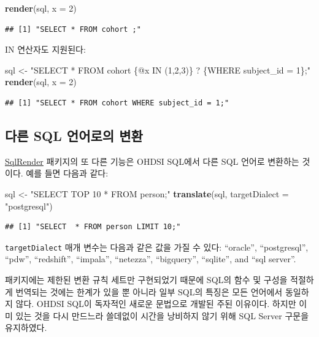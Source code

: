 \documentclass[10.5pt]{book}
\newenvironment{Shaded}{\begin{snugshade}}{\end{snugshade}}
\newcommand{\KeywordTok}[1]{\textcolor[rgb]{0.13,0.29,0.53}{\textbf{#1}}}
\newcommand{\DataTypeTok}[1]{\textcolor[rgb]{0.13,0.29,0.53}{#1}}
\newcommand{\DecValTok}[1]{\textcolor[rgb]{0.00,0.00,0.81}{#1}}
\newcommand{\StringTok}[1]{\textcolor[rgb]{0.31,0.60,0.02}{#1}}
\newcommand{\NormalTok}[1]{#1}
\theoremstyle{definition}
\theoremstyle{definition}
\theoremstyle{definition}
\theoremstyle{remark}
\let\BeginKnitrBlock\begin \let\EndKnitrBlock\end
\begin{document}
\begin{Shaded}
\begin{Highlighting}[]
\KeywordTok{render}\NormalTok{(sql, }\DataTypeTok{x =} \DecValTok{2}\NormalTok{)}
\end{Highlighting}
\end{Shaded}

\begin{verbatim}
## [1] "SELECT * FROM cohort ;"
\end{verbatim}

IN 연산자도 지원된다:

\begin{Shaded}
\begin{Highlighting}[]
\NormalTok{sql <-}\StringTok{ "SELECT * FROM cohort \{@x IN (1,2,3)\} ? \{WHERE subject_id = 1\};"}
\KeywordTok{render}\NormalTok{(sql, }\DataTypeTok{x =} \DecValTok{2}\NormalTok{)}
\end{Highlighting}
\end{Shaded}

\begin{verbatim}
## [1] "SELECT * FROM cohort WHERE subject_id = 1;"
\end{verbatim}

\subsection{다른 SQL 언어로의 변환}\label{-sql--}

\href{https://ohdsi.github.io/SqlRender/}{SqlRender} 패키지의 또 다른
기능은 OHDSI SQL에서 다른 SQL 언어로 변환하는 것이다. 예를 들면 다음과
같다:

\begin{Shaded}
\begin{Highlighting}[]
\NormalTok{sql <-}\StringTok{ "SELECT TOP 10 * FROM person;"}
\KeywordTok{translate}\NormalTok{(sql, }\DataTypeTok{targetDialect =} \StringTok{"postgresql"}\NormalTok{)}
\end{Highlighting}
\end{Shaded}

\begin{verbatim}
## [1] "SELECT  * FROM person LIMIT 10;"
\end{verbatim}

\texttt{targetDialect} 매개 변수는 다음과 같은 값을 가질 수 있다:
``oracle'', ``postgresql'', ``pdw'', ``redshift'', ``impala'',
``netezza'', ``bigquery'', ``sqlite'', and ``sql server''.

\BeginKnitrBlock{rmdimportant}
패키지에는 제한된 변환 규칙 세트만 구현되었기 때문에 SQL의 함수 및
구성을 적절하게 번역되는 것에는 한계가 있을 뿐 아니라 일부 SQL의 특징은
모든 언어에서 동일하지 않다. OHDSI SQL이 독자적인 새로운 문법으로 개발된
주된 이유이다. 하지만 이미 있는 것을 다시 만드느라 쓸데없이 시간을
낭비하지 않기 위해 SQL Server 구문을 유지하였다.
\EndKnitrBlock{rmdimportant}
\end{document}
